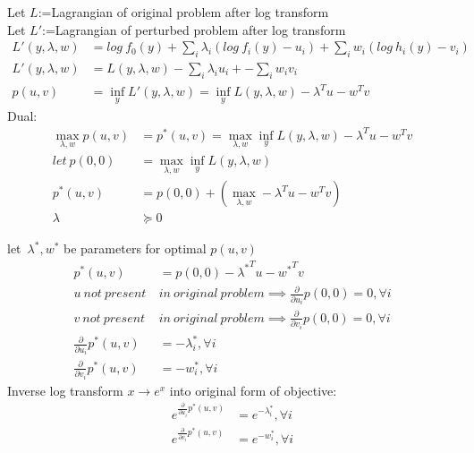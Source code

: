 \documentclass[12pt,letter]{article}
\begin{document}
\begin{enumerate}
  Let $L$:=Lagrangian of original problem after log transform\\
  Let $L'$:=Lagrangian of perturbed problem after log transform\\
  \begin{align*}
    L'(y,\lambda,w) &= log\ f_0(y) + \sum_i \lambda_i(log\ f_i(y)-u_i) + \sum_i w_i(log\ h_i(y) -v_i)\\
    L'(y,\lambda,w) &= L(y,\lambda,w) -\sum_i \lambda_i u_i + -\sum_i w_i v_i\\
    p(u,v) &= \inf_y L'(y,\lambda,w) = \inf_y L(y,\lambda,w) - \lambda^Tu- w^Tv
  \end{align*}
  Dual:
  \begin{align*}
  \max_{\lambda,w} p(u,v) &= p^*(u,v) = \max_{\lambda,w} \inf_y L(y,\lambda,w) - \lambda^Tu- w^Tv\\
    let\ p(0,0) &= \max_{\lambda,w} \inf_y L(y,\lambda,w)\\
    p^*(u,v) &= p(0,0) + (\max_{\lambda,w} -\lambda^Tu- w^Tv)\\
    \lambda & \succeq 0
  \end{align*}
  
  let\ $\lambda^*, w^*$ be parameters for optimal $p(u,v)$
  \begin{align*}
    p^*(u,v) &= p(0,0) -{\lambda^*}^Tu- {w^*}^Tv\\
             u\ not\ present\ &in\ original\ problem \implies \frac{\partial}{\partial u_i}p(0,0) = 0, \forall i\\
             v\ not\ present\ &in\ original\ problem \implies \frac{\partial}{\partial v_i}p(0,0) = 0, \forall i\\
    \frac{\partial}{\partial u_i} p^*(u,v) &= -\lambda_i^*, \forall i\\
    \frac{\partial}{\partial v_i} p^*(u,v) &= -w_i^*, \forall i
  \end{align*}
  Inverse log transform $x \to e^x$ into original form of objective:
  \begin{align*}
    e^{\frac{\partial}{\partial u_i} p^*(u,v)} &= e^{-\lambda_i^*}, \forall i\\
    e^{\frac{\partial}{\partial v_i} p^*(u,v)} &= e^{-w_i^*}, \forall i\\
  \end{align*}
  

\end{enumerate}
\end{document}
